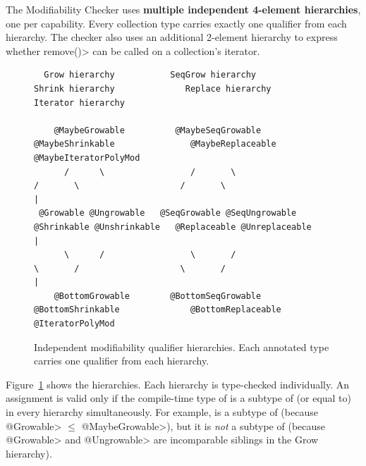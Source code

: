 The Modifiability Checker uses \textbf{multiple independent 4-element
hierarchies}, one per capability.  Every collection type carries exactly
one qualifier from each hierarchy.  The checker also uses an additional
2-element hierarchy to express whether \<remove()> can be called on
a collection's iterator.

\begin{figure}
\begin{smaller}
  \centering
  \begin{minipage}{0.85\linewidth}
\begin{verbatim}
  Grow hierarchy           SeqGrow hierarchy             Shrink hierarchy              Replace hierarchy             Iterator hierarchy

    @MaybeGrowable          @MaybeSeqGrowable         @MaybeShrinkable               @MaybeReplaceable           @MaybeIteratorPolyMod
      /      \                 /       \                    /       \                    /       \                          |
 @Growable @Ungrowable   @SeqGrowable @SeqUngrowable  @Shrinkable @Unshrinkable   @Replaceable @Unreplaceable               |
      \      /                 \       /                    \       /                    \       /                          |
    @BottomGrowable        @BottomSeqGrowable          @BottomShrinkable              @BottomReplaceable            @IteratorPolyMod
\end{verbatim}
  \end{minipage}
\end{smaller}
  \caption{Independent modifiability qualifier hierarchies.
    Each annotated type carries one qualifier from each hierarchy.}
  \label{fig-modifiability-lattice}
\end{figure}

Figure~\ref{fig-modifiability-lattice} shows the hierarchies.
Each hierarchy is type-checked individually.
An assignment  is valid only if the compile-time type of  is a
subtype of (or equal to)  in every hierarchy simultaneously.  For
example,  is a
subtype of 
(because \<@Growable> $\le$ \<@MaybeGrowable>), but it is \emph{not} a
subtype of 
(because \<@Growable> and \<@Ungrowable> are incomparable siblings in the
Grow hierarchy).


